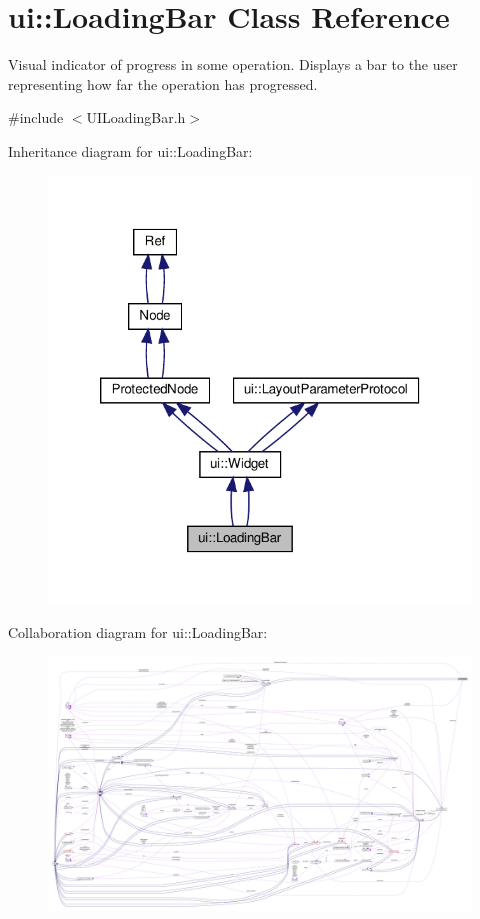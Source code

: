 \hypertarget{classui_1_1LoadingBar}{}\section{ui\+:\+:Loading\+Bar Class Reference}
\label{classui_1_1LoadingBar}


Visual indicator of progress in some operation. Displays a bar to the user representing how far the operation has progressed.  




{\ttfamily \#include $<$U\+I\+Loading\+Bar.\+h$>$}



Inheritance diagram for ui\+:\+:Loading\+Bar\+:
\nopagebreak
\begin{figure}[H]
\begin{center}
\leavevmode
\includegraphics[width=320pt]{classui_1_1LoadingBar__inherit__graph}
\end{center}
\end{figure}


Collaboration diagram for ui\+:\+:Loading\+Bar\+:
\nopagebreak
\begin{figure}[H]
\begin{center}
\leavevmode
\includegraphics[width=350pt]{classui_1_1LoadingBar__coll__graph}
\end{center}
\end{figure}
